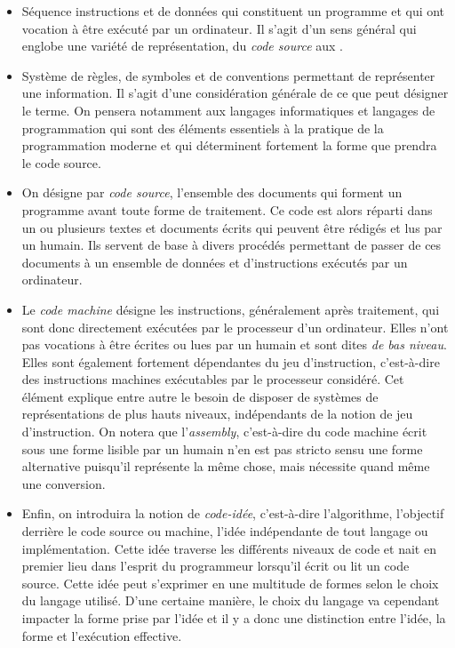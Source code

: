 \documentclass[12pt]{article} %
\begin{document}
\begin{itemize}
    \item Séquence instructions et de données qui constituent un programme et qui ont vocation à être exécuté par un ordinateur. Il s'agit d'un sens général qui englobe une variété de représentation, du \textit{code source} aux .
    \item Système de règles, de symboles et de conventions permettant de représenter une information. Il s'agit d'une considération générale de ce que peut désigner le terme. On pensera notamment aux langages informatiques et langages de programmation qui sont des éléments essentiels à la pratique de la programmation moderne et qui déterminent fortement la forme que prendra le code source.
    \item On désigne par \textit{code source}, l'ensemble des documents qui forment un programme avant toute forme de traitement. Ce code est alors réparti dans un ou plusieurs textes et documents écrits qui peuvent être rédigés et lus par un humain. Ils servent de base à divers procédés permettant de passer de ces documents à un ensemble de données et d'instructions exécutés par un ordinateur. 
    \item Le \textit{code machine} désigne les instructions, généralement après traitement, qui sont donc directement exécutées par le processeur d'un ordinateur. Elles n'ont pas vocations à être écrites ou lues par un humain et sont dites \textit{de bas niveau}. Elles sont également fortement dépendantes du jeu d'instruction, c'est-à-dire des instructions machines exécutables par le processeur considéré. Cet élément explique entre autre le besoin de disposer de systèmes de représentations de plus hauts niveaux, indépendants de la notion de jeu d'instruction. On notera que l'\textit{assembly}, c'est-à-dire du code machine écrit sous une forme lisible par un humain n'en est pas stricto sensu une forme alternative puisqu'il représente la même chose, mais nécessite quand même une conversion.
    \item Enfin, on introduira la notion de \textit{code-idée}, c'est-à-dire l'algorithme, l'objectif derrière le code source ou machine, l'idée indépendante de tout langage ou implémentation. Cette idée traverse les différents niveaux de code et nait en premier lieu dans l'esprit du programmeur lorsqu'il écrit ou lit un code source. Cette idée peut s'exprimer en une multitude de formes selon le choix du langage utilisé. D'une certaine manière, le choix du langage va cependant impacter la forme prise par l'idée et il y a donc une distinction entre l'idée, la forme et l'exécution effective.
\end{itemize}
\end{document}
